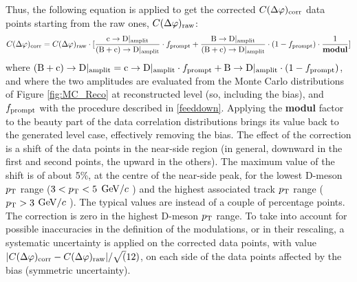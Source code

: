Thus, the following equation is applied to get the corrected $C(\Delta\varphi)_{\rm corr}$ data points starting from the raw ones, $C(\Delta\varphi)_{\rm raw}$:
\begin{equation}
C(\Delta\varphi)_{\rm corr} = C(\Delta\varphi)_{\rm raw} \cdot [\frac{{\rm c}\rightarrow{\rm D}|_{\rm amplit}}{{\rm (B+c)}\rightarrow{\rm D}|_{\rm amplit}} \cdot f_{\rm prompt} + \frac{{\rm B}\rightarrow{\rm D}|_{\rm amplit}}{{\rm (B+c)}\rightarrow{\rm D}|_{\rm amplit}} \cdot (1-f_{\rm prompt})\cdot\frac{1}{\bf modul}]
\end{equation}
where ${\rm (B+c)}\rightarrow{\rm D}|_{\rm amplit} = {\rm c}\rightarrow{\rm D}|_{\rm amplit} \cdot f_{\rm prompt} + {\rm B}\rightarrow{\rm D}|_{\rm amplit} \cdot (1-f_{\rm prompt})$, and where the two amplitudes are evaluated from the Monte Carlo distributions of Figure \ref{fig:MC_Reco} at reconstructed level (so, including the bias), and $f_{\rm prompt}$ with the procedure described in \ref{feeddown}.
Applying the {\bf modul} factor to the beauty part of the data correlation distributions brings its value back to the generated level case, effectively removing the bias.
The effect of the correction is a shift of the data points in the near-side region (in general, downward in the first and second points, the upward in the others). The maximum value of the shift is of about 5\%, at the centre of the near-side peak, for the lowest D-meson $p_{\rm T}$ range ($3 < p_{\rm T} < 5$ $\mathrm{GeV}/c$ ) and the highest associated track $p_{\rm T}$ range ($p_{\rm T} > 3$ $\mathrm{GeV}/c$ ). The typical values are instead of a couple of percentage points. The correction is zero in the highest D-meson $p_{\rm T}$ range.
To take into account for possible inaccuracies in the definition of the modulations, or in their rescaling, a systematic uncertainty is  applied on the corrected data points, with value $|C(\Delta\varphi)_{\rm corr} - C(\Delta\varphi)_{\rm raw}|/\sqrt(12)$, on each side of the data points affected by the bias (symmetric uncertainty).

\clearpage
%
